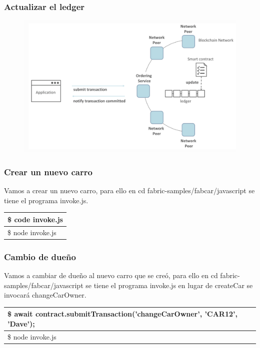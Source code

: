 \documentclass{beamer}
\begin{document}
	\begin{frame}
		\frametitle{Actualizar el ledger}
		\begin{figure}[h]
			\includegraphics[scale=.4]{app_04}
			\centering
		\end{figure}
	\end{frame}

	\begin{frame}
		\frametitle{Crear un nuevo carro}
		Vamos a crear un nuevo carro, para ello en cd fabric-samples/fabcar/javascript se tiene el programa invoke.js.
		\begin{center}
			\begin{tabulary}{\linewidth}{L}
				\hline
				\$ code invoke.js \\
				\hline
				\$ node invoke.js \\
				\hline
			\end{tabulary} 
		\end{center}
	\end{frame}
	
	\begin{frame}
		\frametitle{Cambio de dueño}
		Vamos a cambiar de dueño al nuevo carro que se creó, para ello en cd fabric-samples/fabcar/javascript se tiene el programa invoke.js en lugar de createCar se invocará changeCarOwner.
		\begin{center}
			\begin{tabulary}{\linewidth}{L}
				\hline
				\$ await contract.submitTransaction('changeCarOwner', 'CAR12', 'Dave'); \\
				\hline
				\$ node invoke.js \\
				\hline
			\end{tabulary} 
		\end{center}
	\end{frame}
	
\end{document}
